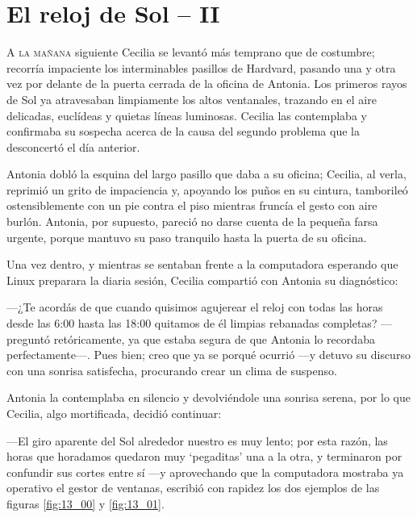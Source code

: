 \chapter{El reloj de Sol -- II}

\lettrine[lines=2]{A}{ la mañana} siguiente Cecilia se levantó más
temprano que de costumbre; recorría impaciente los interminables
pasillos de Hardvard, pasando una y otra vez por delante de la puerta
cerrada de la oficina de Antonia. Los primeros rayos de Sol ya
atravesaban limpiamente los altos ventanales, trazando en el aire
delicadas, euclídeas y quietas líneas luminosas. Cecilia las
contemplaba y confirmaba su sospecha acerca de la causa del segundo
problema que la desconcertó el día anterior.

Antonia dobló la esquina del largo pasillo que daba a su oficina;
Cecilia, al verla, reprimió un grito de impaciencia y, apoyando los
puños en su cintura, tamborileó ostensiblemente con un pie contra el
piso mientras fruncía el gesto con aire burlón. Antonia, por supuesto,
pareció no darse cuenta de la pequeña farsa urgente, porque mantuvo su
paso tranquilo hasta la puerta de su oficina.

Una vez dentro, y mientras se sentaban frente a la computadora
esperando que Linux preparara la diaria sesión, Cecilia compartió con
Antonia su diagnóstico:

---¿Te acordás de que cuando quisimos agujerear el reloj con todas las
horas desde las 6:00 hasta las 18:00 quitamos de él limpias rebanadas
completas? ---preguntó retóricamente, ya que estaba segura de que
Antonia lo recordaba perfectamente---. Pues bien; creo que ya se
porqué ocurrió  ---y detuvo su discurso con una sonrisa satisfecha,
procurando crear un clima de suspenso.

Antonia la contemplaba en silencio y devolviéndole una sonrisa serena,
por lo que Cecilia, algo mortificada, decidió continuar:

---El giro aparente del Sol alrededor nuestro es muy lento; por esta
razón, las horas que horadamos quedaron muy `pegaditas' una a la otra,
y terminaron por confundir sus cortes entre sí ---y aprovechando que
la computadora mostraba ya operativo el gestor de ventanas, escribió
con rapidez los dos ejemplos de las figuras \ref{fig:13_00} y
\ref{fig:13_01}.

